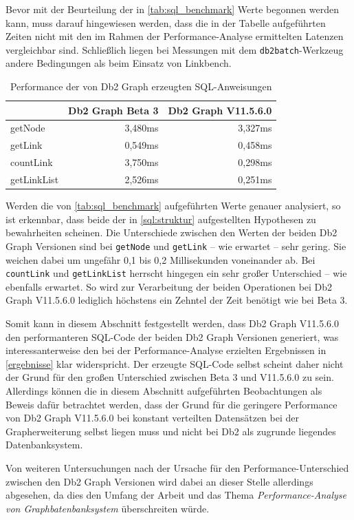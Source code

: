 Bevor mit der Beurteilung der in \autoref{tab:sql_benchmark} Werte begonnen werden kann, muss darauf hingewiesen werden, dass die in der Tabelle aufgeführten Zeiten nicht mit den im Rahmen der Performance-Analyse ermittelten Latenzen vergleichbar sind. Schließlich liegen bei Messungen mit dem \texttt{db2batch}-Werkzeug andere Bedingungen als beim Einsatz von Linkbench. 

\begin{table}[!ht]
    \centering
    \begin{tabular}{l|r|r}
    \hline
    \rowcolor[HTML]{EFEFEF} 
    \multicolumn{1}{c|}{\cellcolor[HTML]{EFEFEF}{\color[HTML]{333333} \textbf{SQL-Anweisung}}} & \multicolumn{1}{c|}{\cellcolor[HTML]{EFEFEF}\textbf{Db2 Graph Beta 3}} & \multicolumn{1}{c}{\cellcolor[HTML]{EFEFEF}\textbf{Db2 Graph V11.5.6.0}} \\ \hline
    getNode & 3,480ms & 3,327ms \\
    getLink & 0,549ms & 0,458ms \\
    countLink & 3,750ms & 0,298ms \\
    getLinkList & 2,526ms & 0,251ms \\ \hline
    \end{tabular}
    \caption{Performance der von Db2 Graph erzeugten SQL-Anweisungen}
    \label{tab:sql_benchmark}
\end{table}

Werden die von \autoref{tab:sql_benchmark} aufgeführten Werte genauer analysiert, so ist erkennbar, dass beide der in \autoref{sql:struktur} aufgestellten Hypothesen zu bewahrheiten scheinen. Die Unterschiede zwischen den Werten der beiden Db2 Graph Versionen sind bei \texttt{getNode} und \texttt{getLink} -- wie erwartet -- sehr gering. Sie weichen dabei um ungefähr 0,1 bis 0,2 Millisekunden voneinander ab. Bei \texttt{countLink} und \texttt{getLinkList} herrscht hingegen ein sehr großer Unterschied -- wie ebenfalls erwartet. So wird zur Verarbeitung der beiden Operationen bei Db2 Graph V11.5.6.0 lediglich höchstens ein Zehntel der Zeit benötigt wie bei Beta 3. 

Somit kann in diesem Abschnitt festgestellt werden, dass Db2 Graph V11.5.6.0 den performanteren SQL-Code der beiden Db2 Graph Versionen generiert, was interessanterweise den bei der Performance-Analyse erzielten Ergebnissen in \autoref{ergebnisse} klar widerspricht. Der erzeugte SQL-Code selbst scheint daher nicht der Grund für den großen Unterschied zwischen Beta 3 und V11.5.6.0 zu sein. Allerdings können die in diesem Abschnitt aufgeführten Beobachtungen als Beweis dafür betrachtet werden, dass der Grund für die geringere Performance von Db2 Graph V11.5.6.0 bei konstant verteilten Datensätzen bei der Grapherweiterung selbst liegen muss und nicht bei Db2 als zugrunde liegendes Datenbanksystem. 

Von weiteren Untersuchungen nach der Ursache für den Performance-Unterschied zwischen den Db2 Graph Versionen wird dabei an dieser Stelle allerdings abgesehen, da dies den Umfang der Arbeit und das Thema \textit{Performance-Analyse von Graphbatenbanksystem} überschreiten würde.